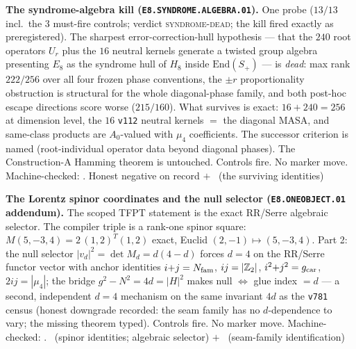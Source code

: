 \par\smallskip\noindent\textbf{The syndrome-algebra kill
(\texttt{E8.SYNDROME.ALGEBRA.01}).}
One probe ($13/13$ incl.\ the $3$ must-fire controls; verdict
\textsc{syndrome-dead}; the kill fired exactly as preregistered).
The sharpest error-correction-hull hypothesis --- that the $240$
root operators $U_r$ plus the $16$ neutral kernels generate a
twisted group algebra presenting $E_8$ as the syndrome hull of
$H_8$ inside $\mathrm{End}(S_+)$ --- is \emph{dead}: max rank
$222/256$ over all four frozen phase conventions, the $\pm r$
proportionality obstruction is structural for the whole
diagonal-phase family, and both post-hoc escape directions score
worse ($215/160$).  What survives is exact: $16+240=256$ at
dimension level, the $16$ \texttt{v112} neutral kernels $=$ the
diagonal MASA, and same-class products are $A_0$-valued with
$\mu_4$ coefficients.  The successor criterion is named
(root-individual operator data beyond diagonal phases).  The
Construction-A Hamming theorem is untouched.  Controls fire.  No
marker move.
Machine-checked: .
Honest negative on record $+$ \mE\ (the surviving identities)
\par\smallskip

\par\smallskip\noindent\textbf{The Lorentz spinor coordinates and
the null selector (\texttt{E8.ONEOBJECT.01} addendum).}
The scoped TFPT statement is the exact RR/Serre algebraic selector.
The compiler triple is a rank-one spinor square:
$M(5,-3,4)=2\,(1,2)^{T}(1,2)$ exact, Euclid
$(2,-1)\mapsto(5,-3,4)$.  Part 2: the null
selector $|v_d|^2=\det M_d=d(4-d)$ forces $d=4$ on the RR/Serre
functor vector with anchor identities $i{+}j=N_{\mathrm{fam}}$, $ij=|\mathbb{Z}_2|$,
$i^2{+}j^2=g_{\mathrm{car}}$, $2ij=|\mu_4|$; the bridge $g^2-N^2=4d=|H|^2$
makes null $\iff$ glue index $=d$ --- a second, independent $d=4$
mechanism on the same invariant $4d$ as the \texttt{v781} census
(honest downgrade recorded: the seam family has no $d$-dependence
to vary; the missing theorem typed).  Controls fire.  No marker
move.
Machine-checked: .
\mE\ (spinor identities; algebraic selector) $+$
\mO\ (seam-family identification)
\par\smallskip

